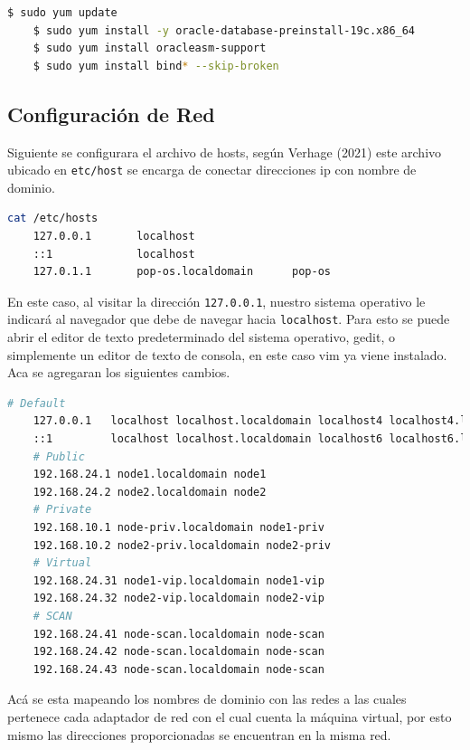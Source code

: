 \documentclass{article}
\begin{document}
\begin{lstlisting}[style=mystyle,language=bash]
	$ sudo yum update
	$ sudo yum install -y oracle-database-preinstall-19c.x86_64
	$ sudo yum install oracleasm-support
	$ sudo yum install bind* --skip-broken
\end{lstlisting}

\subsection{Configuración de Red}

Siguiente se configurara el archivo de hosts, según Verhage (2021) este archivo ubicado en \texttt{etc/host} se encarga de conectar direcciones ip con nombre de dominio.

\begin{lstlisting}[style=mystyle,language=bash]
	cat /etc/hosts
	127.0.0.1   	localhost
	::1         	localhost
	127.0.1.1   	pop-os.localdomain  	pop-os
\end{lstlisting}

En este caso, al visitar la dirección \texttt{127.0.0.1}, nuestro sistema operativo le indicará al navegador que debe de navegar hacia \texttt{localhost}. Para esto se puede abrir el editor de texto predeterminado del sistema operativo, gedit, o simplemente un editor de texto de consola, en este caso vim ya viene instalado. Aca se agregaran los siguientes cambios.

\begin{lstlisting}[style=mystyle,language=bash]
	# Default
	127.0.0.1   localhost localhost.localdomain localhost4 localhost4.localdomain4
	::1     	localhost localhost.localdomain localhost6 localhost6.localdomain6
	# Public
	192.168.24.1 node1.localdomain node1
	192.168.24.2 node2.localdomain node2
	# Private
	192.168.10.1 node-priv.localdomain node1-priv
	192.168.10.2 node2-priv.localdomain node2-priv
	# Virtual
	192.168.24.31 node1-vip.localdomain node1-vip
	192.168.24.32 node2-vip.localdomain node2-vip
	# SCAN
	192.168.24.41 node-scan.localdomain node-scan
	192.168.24.42 node-scan.localdomain node-scan
	192.168.24.43 node-scan.localdomain node-scan
\end{lstlisting}

Acá se esta mapeando los nombres de dominio con las redes a las cuales pertenece cada adaptador de red con el cual cuenta la máquina virtual, por esto mismo las direcciones proporcionadas se encuentran en la misma red.
\end{document}
